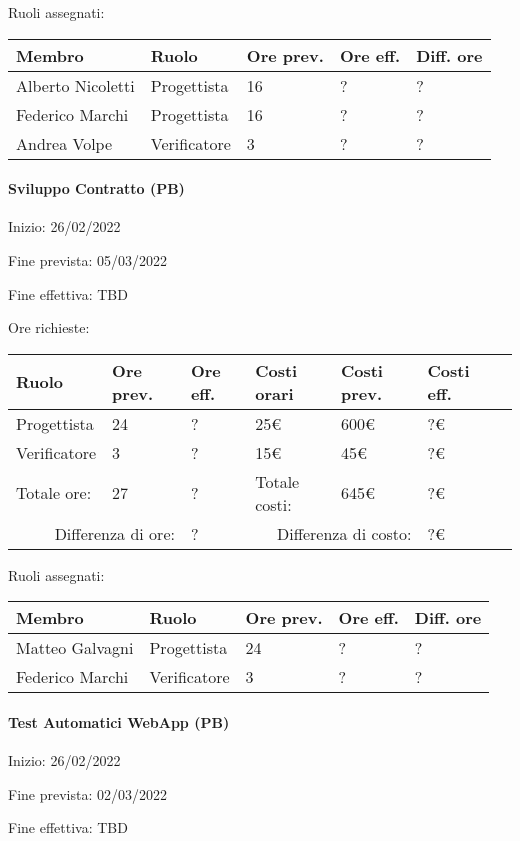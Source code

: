 \documentclass[a4paper, 12pt]{article}
\begin{document}
Ruoli assegnati:\\[0.5em]
\begin{tabular}{|l|l|l|l|l|}\hline
Membro & Ruolo & Ore prev. & Ore eff. & Diff. ore \\\hline
Alberto Nicoletti & Progettista & 16 & ? & ? \\\hline
Federico Marchi & Progettista & 16 & ? & ? \\\hline
Andrea Volpe & Verificatore & 3 & ? & ? \\\hline
\end{tabular}

\paragraph{Sviluppo Contratto (PB)}
Inizio: 26/02/2022\par
Fine prevista: 05/03/2022\par
Fine effettiva: TBD

Ore richieste:\\[0.5em]
\begin{tabular}{|l|l|l||l|l|l|l|}\hline
Ruolo & Ore prev. & Ore eff. & Costi orari & Costi prev. & Costi eff.\\\hline
Progettista & 24 & ? & 25\euro & 600\euro & ?\euro \\\hline
Verificatore & 3 & ? & 15\euro & 45\euro & ?\euro \\\hline
Totale ore: & 27 & ? & Totale costi: & 645\euro & ?\euro \\\hline
\multicolumn{2}{|r|}{Differenza di ore:} & ? & \multicolumn{2}{r|}{Differenza di costo:} & ?\euro \\\hline
\end{tabular}

Ruoli assegnati:\\[0.5em]
\begin{tabular}{|l|l|l|l|l|}\hline
Membro & Ruolo & Ore prev. & Ore eff. & Diff. ore \\\hline
Matteo Galvagni & Progettista & 24 & ? & ? \\\hline
Federico Marchi & Verificatore & 3 & ? & ? \\\hline
\end{tabular}

\paragraph{Test Automatici WebApp (PB)}
Inizio: 26/02/2022\par
Fine prevista: 02/03/2022\par
Fine effettiva: TBD
\end{document}

